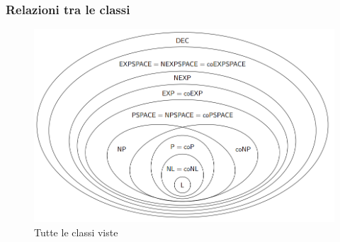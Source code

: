 \documentclass{article}
\begin{document}
\newpage

\subsubsection{Relazioni tra le classi}

\begin{figure}[ht]
    \centering
    \includegraphics[width=\linewidth]{classi.png}
    \caption{Tutte le classi viste}
    \label{fig:classi}
\end{figure}
\end{document}
